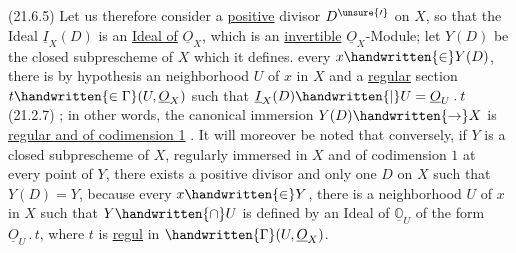 (21.6.5) Let us therefore consider a \uline{positive} divisor $D^{\unsure{\prime}}$ on $X$, so that the  Ideal $\underline I_{X}(D)$ is an \uline{Ideal of} $\underline O_{X}$, which is an \uline{invertible} $\underline O_{X}$-Module; let $Y(D)$ be the closed subprescheme of $X$ which it defines.   every $x\handwritten{\in}Y(D)$,  there is by hypothesis an  neighborhood $U$ of $x$ in $X$ and a \uline{regular} section $t\handwritten{\in\Gamma}(U,\underline O_{X})$ such that $\underline I_{X}(D)\handwritten{\mid}U=\underline O_{U}\mathbin{.}t$ (21.2.7) ; in other words, the canonical immersion $Y(D)\handwritten{\to}X$ is \uline{regular and of codimension 1} . It will moreover be noted that conversely, if $Y$ \reversemarginpar
is a closed subprescheme of $X$, regularly immersed in $X$ and  of codimension $1$ at every point of $Y$, there exists a positive divisor and only one  $D$ on $X$ such that $Y(D)=Y$, because  every $x\handwritten{\in}Y$, there is a neighborhood $U$ of $x$ in $X$ such that $Y\handwritten{\cap}U$ is defined by an Ideal of $\underline{\mathbb{O}}_{U}$ of the form $\underline O_{U}\mathbin{.}t$, where $t$ is \uline{regul} in $\handwritten{\Gamma}(U,\underline O_{X})$.


